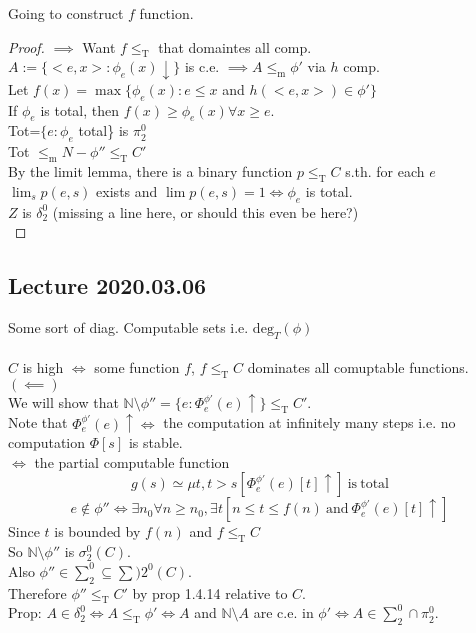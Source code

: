 \documentclass{article}
\newcommand{\N}{\mathbb{N}}
\newcommand{\tr}{\leq_\mathrm{T}}
\newcommand{\halts}{\downarrow}
\newcommand{\mor}{\leq_\mathrm{m}}
\theoremstyle{definition}
\theoremstyle{remark}
\theoremstyle{example}
\begin{document}
	Going to construct $f$ function.
	\begin{proof}
		$\implies$ Want $f \tr$ that domaintes all comp.\\
		$A:= \{<e,x>:\phi_e(x)\halts\}$ is c.e. $\implies A \mor \phi'$ via $h$ comp.\\
		Let $f(x)=\max\{\phi_e(x):e \leq x$ and $h(<e,x>) \in \phi'\}$\\
		If $\phi_e$ is total, then $f(x) \geq \phi_e(x) \forall x \geq e$.\\
		Tot=$\{e:\phi_e$ total\} is $\pi_2^0$\\
		Tot $\mor N-\phi''\tr C'$\\
		By the limit lemma, there is a binary function $p \tr C$ s.th. for each $e$ $\lim_s p(e,s)$ exists and $\lim p(e,s)=1 \iff \phi_e$ is total.\\
		$Z$ is $\delta_2^0$ (missing a line here, or should this even be here?)\\
		
	\end{proof}

	\subsection*{Lecture 2020.03.06}
	Some sort of diag.
	Computable sets i.e. $\mathrm{deg}_T(\phi)$\\
	\\
	$C$ is high $\iff$ some function $f$, $f \tr C$ dominates all comuptable functions.\\
	$(\impliedby)$\\
	We will show that $\N \setminus \phi''=\{e:\Phi_e^{\phi'}(e)\uparrow \} \tr C'$.\\
	Note that $\Phi_e^{\phi'}(e)\uparrow \iff$ the computation at infinitely many steps i.e. no computation $\Phi[s]$ is stable.\\
	$\iff$ the partial computable function \[g(s) \simeq \mu t, t > s [\Phi_e^{\phi'}(e)[t]\uparrow]\ \mathrm{is\ total} \]
	\[e \notin \phi'' \iff \exists n_0 \forall n \geq n_0, \exists t \left[n \leq t \leq f(n)\ \mathrm{and}\ \Phi_e^{\phi'}(e)[t]\uparrow \right]  \]
	Since $t$ is bounded by $f(n)$ and $f \tr C$\\
	So $\N\setminus\phi''$ is $\sigma_2^0(C)$.\\
	Also $\phi'' \in \sum_2^0 \subseteq \sum)2^0(C)$.\\
	Therefore $\phi'' \tr C'$ by prop 1.4.14 relative to $C$.\\
	Prop: $A \in \delta_2^0 \iff A \tr \phi' \iff A$ and $\N \setminus A$ are c.e. in $\phi' \iff A \in \sum_2^0 \cap \pi_2^0$.\\
	
\end{document}
